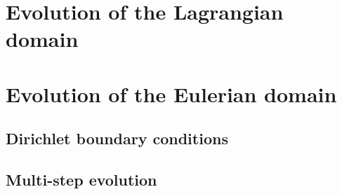 



%
%





\section{Evolution of the Lagrangian domain}

\section{Evolution of the Eulerian domain}

\subsection{Dirichlet boundary conditions}

\subsection{Multi-step evolution}

